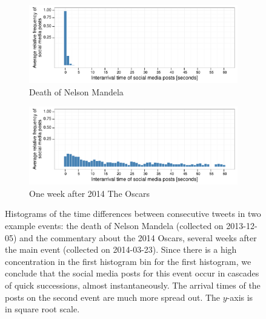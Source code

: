 \begin{figure}
    \centering
    \begin{subfigure}[b]{\textwidth}
        \centering 
        \includegraphics[width=.8\textwidth]{figures/high-activity/fig1a}
        \caption{Death of Nelson Mandela}
        \label{fig:hi:example-mandela}
    \end{subfigure}
    
    \begin{subfigure}[b]{\textwidth}
        \centering
        \includegraphics[width=.8\textwidth]{figures/high-activity/fig1b}
        \caption{One week after 2014 The Oscars}
        \label{fig:hi:example-oscars}
    \end{subfigure}

    \caption[Example histograms of time differences between tweets]{Histograms
        of the time differences between consecutive tweets in two example
        events: the death of Nelson Mandela (collected on 2013-12-05) and the
        commentary about the 2014 Oscars, several weeks after the main event
        (collected on 2014-03-23). Since there is a high concentration in the
        first histogram bin for the first histogram, we conclude that the social
        media posts for this event occur in cascades of quick successions,
        almost instantaneously. The arrival times of the posts on the second
        event are much more spread out. The $y$-axis is in square root scale.}
    \label{fig:hi:examples}
\end{figure}


